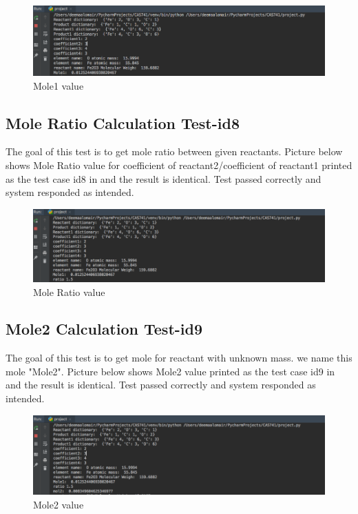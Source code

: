 \documentclass[12pt, titlepage]{article}
\begin{document}
\begin{figure}[H]
 \begin{center}
 \includegraphics [width=\textwidth]{mole1}
 \caption{\label{ Figure 9:} Mole1 value}
 \end{center}
 \end{figure}

\subsection{Mole Ratio Calculation Test-id8}

The goal of this test is to get mole ratio between given reactants. Picture below shows Mole Ratio value for coefficient of reactant2/coefficient of reactant1 printed  as the test case id8 in \cite{SystemVnVPlan} and the result is identical. Test passed correctly and system responded as intended.

\begin{figure}[H]
 \begin{center}
 \includegraphics [width=\textwidth]{moleratio}
 \caption{\label{ Figure 10:} Mole Ratio value}
 \end{center}
 \end{figure}

\subsection{Mole2 Calculation Test-id9}

The goal of this test is to get mole for reactant with unknown mass. we name this mole "Mole2". Picture below shows Mole2 value printed as the test case id9 in \cite{SystemVnVPlan} and the result is identical. Test passed correctly and system responded as intended.

\begin{figure}[H]
 \begin{center}
 \includegraphics [width=\textwidth]{mole2}
 \caption{\label{ Figure 11:} Mole2 value}
 \end{center}
 \end{figure}
 
\end{document}
